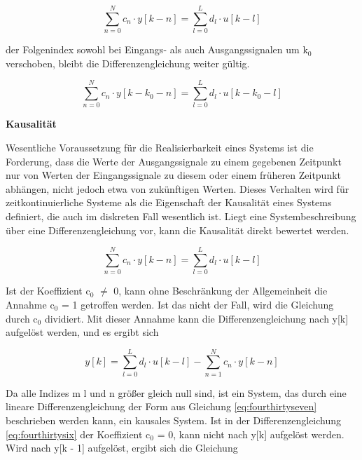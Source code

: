 \begin{equation}\label{eq:fourthirtyfour}
\sum _{n=0}^{N}c_{n} \cdot y\left[k-n\right] =\sum _{l=0}^{L}d_{l} \cdot u\left[k-l\right]
\end{equation}

\noindent der Folgenindex sowohl bei Eingangs- als auch Ausgangssignalen um k${}_{0}$ verschoben, bleibt die Differenzengleichung weiter g\"{u}ltig.

\begin{equation}\label{eq:fourthirtyfive}
\sum _{n=0}^{N}c_{n} \cdot y\left[k-k_{0} -n\right] =\sum _{l=0}^{L}d_{l} \cdot u\left[k-k_{0} -l\right]
\end{equation}

{\selectfont
\noindent\textbf{Kausalit\"{a}t}} \smallskip

\noindent Wesentliche Voraussetzung f\"{u}r die Realisierbarkeit eines Systems ist die Forderung, dass die Werte der Ausgangssignale zu einem gegebenen Zeitpunkt nur von Werten der Eingangssignale zu diesem oder einem fr\"{u}heren Zeitpunkt abh\"{a}ngen, nicht jedoch etwa von zuk\"{u}nftigen Werten. Dieses Verhalten wird f\"{u}r zeitkontinuierliche Systeme als die Eigenschaft der Kausalit\"{a}t eines Systems definiert, die auch im diskreten Fall wesentlich ist. Liegt eine Systembeschreibung \"{u}ber eine Differenzengleichung vor, kann die Kausalit\"{a}t direkt bewertet werden. 

\begin{equation}\label{eq:fourthirtysix}
\sum _{n=0}^{N}c_{n} \cdot y\left[k-n\right] =\sum _{l=0}^{L}d_{l} \cdot u\left[k-l\right]
\end{equation}

\noindent Ist der Koeffizient c${}_{0}$ $\neq$ 0, kann ohne Beschr\"{a}nkung der Allgemeinheit die Annahme c${}_{0}$ = 1 getroffen werden. Ist das nicht der Fall, wird die Gleichung durch c${}_{0}$ dividiert. Mit dieser Annahme kann die Differenzengleichung nach y[k] aufgel\"{o}st werden, und es ergibt sich

\begin{equation}\label{eq:fourthirtyseven}
y\left[k\right]=\sum _{l=0}^{L}d_{l} \cdot u\left[k-l\right] -\sum _{n=1}^{N}c_{n} \cdot y\left[k-n\right] 
\end{equation}

\noindent Da alle Indizes m l und n gr\"{o}{\ss}er gleich null sind, ist ein System, das durch eine lineare Differenzengleichung der Form aus Gleichung \eqref{eq:fourthirtyseven} beschrieben werden kann, ein kausales System. Ist in der Differenzengleichung \eqref{eq:fourthirtysix} der Koeffizient c${}_{0}$ = 0, kann nicht nach y[k] aufgel\"{o}st werden. Wird nach y[k - 1] aufgel\"{o}st, ergibt sich die Gleichung

